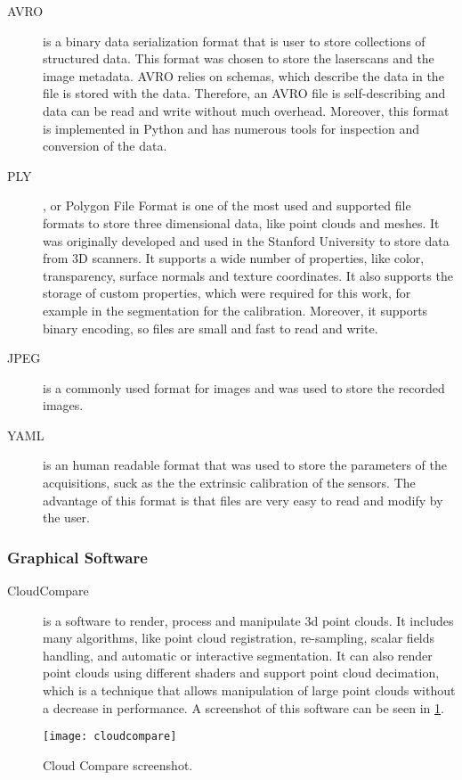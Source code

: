 \begin{description}
    
    \item[AVRO] is a binary data serialization format that is user to store collections of structured data. This format was chosen to store the laserscans and the image metadata. AVRO relies on schemas, which describe the data in the file is stored with the data. Therefore, an AVRO file is self-describing and data can be read and write without much overhead. Moreover, this format is implemented in Python and has numerous tools for inspection and conversion of the data.

    \item[PLY], or Polygon File Format is one of the most used and supported file formats to store three dimensional data, like point clouds and meshes. It was originally developed and used in the Stanford University to store data from 3D scanners. It supports a wide number of properties, like color, transparency, surface normals and texture coordinates. It also supports the storage of custom properties, which were required for this work, for example in the segmentation for the calibration. Moreover, it supports binary encoding, so files are small and fast to read and write.

    \item[JPEG] is a commonly used format for images and was used to store the recorded images.

    \item[YAML] is an human readable format that was used to store the parameters of the acquisitions, suck as the the extrinsic calibration of the sensors. The advantage of this format is that files are very easy to read and modify by the user.

\end{description}

\subsubsection{Graphical Software}

\begin{description}
    
    \item[CloudCompare] is a software to render, process and manipulate 3d point clouds. It includes many algorithms, like point cloud registration, re-sampling, scalar fields handling, and automatic or interactive segmentation. It can also render point clouds using different shaders and support point cloud decimation, which is a technique that allows manipulation of large point clouds without a decrease in performance. A screenshot of this software can be seen in \cref{fig:cloud-compare}.

\end{description}

\begin{figure}[h]
    \centering
    \texttt{[image: cloudcompare]}
    \caption{Cloud Compare screenshot.}
    \label{fig:cloud-compare}
\end{figure}